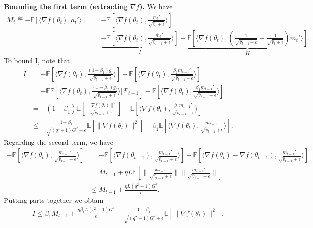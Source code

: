 \documentclass[11pt]{article}
\begin{document}
\textbf{Bounding the first term (extracting $\nabla f$).} We have
\begin{align*}
    M_t\eqdef -\mathbb E[\langle \nabla f(\theta_t), a_t'\rangle]&=-\mathbb E[\langle \nabla f(\theta_t), \frac{\bar m_t'}{\sqrt{\hat v_t+\epsilon}}\rangle]\\
    &=\underbrace{-\mathbb E[\langle \nabla f(\theta_t), \frac{\bar m_t'}{\sqrt{\hat v_{t-1}+\epsilon}} \rangle]}_{I}+\underbrace{\mathbb E[\langle \nabla f(\theta_t), (\frac{1}{\sqrt{\hat v_{t-1}+\epsilon}}-\frac{1}{\sqrt{\hat v_t+\epsilon}})\bar m_t' \rangle]}_{II}.
\end{align*}
To bound I, note that
\begin{align*}
    I&=-\mathbb E[\langle \nabla f(\theta_t), \frac{(1-\beta_1)g_t}{\sqrt{\hat v_{t-1}+\epsilon}} \rangle] -\mathbb E[\langle \nabla f(\theta_t), \frac{\beta_1 m_{t-1}'}{\sqrt{\hat v_{t-1}+\epsilon}} \rangle]\\
    &=-\mathbb E\mathbb E[\langle \nabla f(\theta_t), \frac{(1-\beta_1)g_t}{\sqrt{\hat v_{t-1}+\epsilon}} \rangle|\mathcal F_{t-1}] -\mathbb E[\langle \nabla f(\theta_t), \frac{\beta_1 m_{t-1}'}{\sqrt{\hat v_{t-1}+\epsilon}} \rangle]\\
    &=-(1-\beta_1)\mathbb E[\frac{\|\nabla f(\theta_t)\|^2}{\sqrt{\hat v_{t-1}+\epsilon}}] - \mathbb E[\langle \nabla f(\theta_t), \frac{\beta_1 m_{t-1}'}{\sqrt{\hat v_{t-1}+\epsilon}} \rangle]\\
    &\leq -\frac{1-\beta_1}{\sqrt{(q^2+1)G^2+\epsilon}}\mathbb E[\|\nabla f(\theta_t)\|^2]- \beta_1\mathbb E[\langle \nabla f(\theta_t), \frac{ m_{t-1}'}{\sqrt{\hat v_{t-1}+\epsilon}} \rangle].
\end{align*}
Regarding the second term, we have
\begin{align*}
    - \mathbb E[\langle \nabla f(\theta_t), \frac{ m_{t-1}'}{\sqrt{\hat v_{t-1}+\epsilon}} \rangle]&=-\mathbb E[\langle\nabla f(\theta_{t-1}), \frac{ m_{t-1}'}{\sqrt{\hat v_{t-1}+\epsilon}} \rangle]- \mathbb E[\langle \nabla f(\theta_t)-\nabla f(\theta_{t-1}), \frac{ m_{t-1}'}{\sqrt{\hat v_{t-1}+\epsilon}} \rangle]\\
    &=M_{t-1}+ \eta L\mathbb E[\|\frac{m_{t-1}}{\sqrt{\hat v_{t-1}+\epsilon}}\| \|\frac{m_{t-1}'}{\sqrt{\hat v_{t-1}+\epsilon}}\|]\\
    &\leq M_{t-1}+\frac{\eta L(q^2+1)G^4}{\epsilon}.
\end{align*}
Putting parts together we obtain
\begin{align*}
    I\leq \beta_1 M_{t-1}+\frac{\eta \beta_1 L(q^2+1)G^4}{\epsilon}-\frac{1-\beta_1}{\sqrt{(q^2+1)G^2+\epsilon}}\mathbb E[\|\nabla f(\theta_t)\|^2].
\end{align*}
\end{document}
